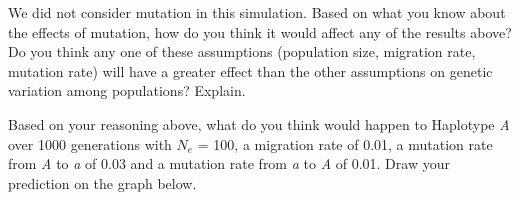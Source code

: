 \documentclass[11pt, addpoints]{exam}
\begin{document}
\begin{questions}


\question[1]
We did not consider mutation in this simulation. Based on
what you know about the effects of mutation, how do you think it would
affect any of the results above? Do you think any one of these
assumptions (population size, migration rate, mutation rate) will have a
greater effect than the other assumptions on genetic variation among
populations? Explain.

\newpage

\question
Based on your reasoning above, what do you think would
happen to Haplotype \emph{A} over 1000 generations with
$N_e$ = 100, a migration rate of 0.01, a mutation
rate from \emph{A} to \emph{a} of 0.03 and a mutation rate from \emph{a}
to \emph{A} of 0.01. Draw your prediction on the graph below.


\end{questions}
\end{document}
